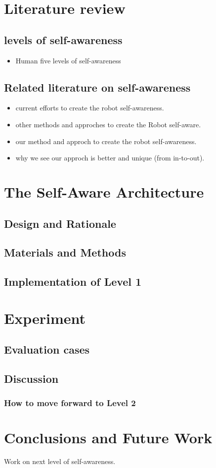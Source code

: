 \documentclass[12pt]{article}
\begin{document}
\section{Literature review}
\subsection{levels of self-awareness}
\begin{itemize}
\item Human five levels of self-awareness
\end{itemize}
\subsection{Related literature on self-awareness}
\begin{itemize}
\item current efforts to create the robot self-awareness.
\item other methods and approches to create the Robot self-aware.
\item our method and approch to create the robot self-awareness.
\item why we see our approch is better and unique (from in-to-out).
\end{itemize}

\section{The Self-Aware Architecture}
\subsection{Design and Rationale}
\subsection{Materials and Methods}
\subsection{Implementation of Level 1}

\section{Experiment}
\subsection{Evaluation cases}
\subsection{Discussion}
\subsubsection{How to move forward to Level 2}


\section{Conclusions and Future Work}
Work on next level of self-awareness.
\end{document}
